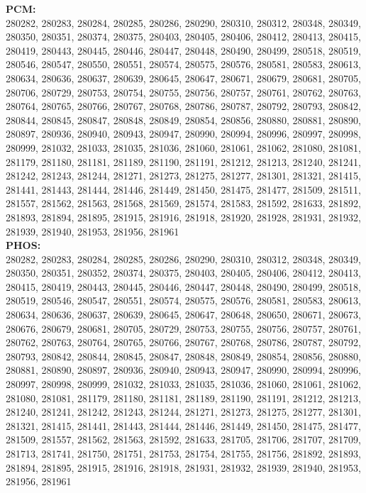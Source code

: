  \textbf{PCM:}\\
280282, 280283, 280284, 280285, 280286, 280290, 280310, 280312, 280348, 280349, 280350, 280351, 280374, 280375, 280403, 280405, 280406, 280412, 280413, 280415, 280419, 280443, 280445, 280446, 280447, 280448, 280490, 280499, 280518, 280519, 280546, 280547, 280550, 280551, 280574, 280575, 280576, 280581, 280583, 280613, 280634, 280636, 280637, 280639, 280645, 280647, 280671, 280679, 280681, 280705, 280706, 280729, 280753, 280754, 280755, 280756, 280757, 280761, 280762, 280763, 280764, 280765, 280766, 280767, 280768, 280786, 280787, 280792, 280793, 280842, 280844, 280845, 280847, 280848, 280849, 280854, 280856, 280880, 280881, 280890, 280897, 280936, 280940, 280943, 280947, 280990, 280994, 280996, 280997, 280998, 280999, 281032, 281033, 281035, 281036, 281060, 281061, 281062, 281080, 281081, 281179, 281180, 281181, 281189, 281190, 281191, 281212, 281213, 281240, 281241, 281242, 281243, 281244, 281271, 281273, 281275, 281277, 281301, 281321, 281415, 281441, 281443, 281444, 281446, 281449, 281450, 281475, 281477, 281509, 281511, 281557, 281562, 281563, 281568, 281569, 281574, 281583, 281592, 281633, 281892, 281893, 281894, 281895, 281915, 281916, 281918, 281920, 281928, 281931, 281932, 281939, 281940, 281953, 281956, 281961\\

 \textbf{PHOS:}\\
280282, 280283, 280284, 280285, 280286, 280290, 280310, 280312, 280348, 280349, 280350, 280351, 280352, 280374, 280375, 280403, 280405, 280406, 280412, 280413, 280415, 280419, 280443, 280445, 280446, 280447, 280448, 280490, 280499, 280518, 280519, 280546, 280547, 280551, 280574, 280575, 280576, 280581, 280583, 280613, 280634, 280636, 280637, 280639, 280645, 280647, 280648, 280650, 280671, 280673, 280676, 280679, 280681, 280705, 280729, 280753, 280755, 280756, 280757, 280761, 280762, 280763, 280764, 280765, 280766, 280767, 280768, 280786, 280787, 280792, 280793, 280842, 280844, 280845, 280847, 280848, 280849, 280854, 280856, 280880, 280881, 280890, 280897, 280936, 280940, 280943, 280947, 280990, 280994, 280996, 280997, 280998, 280999, 281032, 281033, 281035, 281036, 281060, 281061, 281062, 281080, 281081, 281179, 281180, 281181, 281189, 281190, 281191, 281212, 281213, 281240, 281241, 281242, 281243, 281244, 281271, 281273, 281275, 281277, 281301, 281321, 281415, 281441, 281443, 281444, 281446, 281449, 281450, 281475, 281477, 281509, 281557, 281562, 281563, 281592, 281633, 281705, 281706, 281707, 281709, 281713, 281741, 281750, 281751, 281753, 281754, 281755, 281756, 281892, 281893, 281894, 281895, 281915, 281916, 281918, 281931, 281932, 281939, 281940, 281953, 281956, 281961\\

